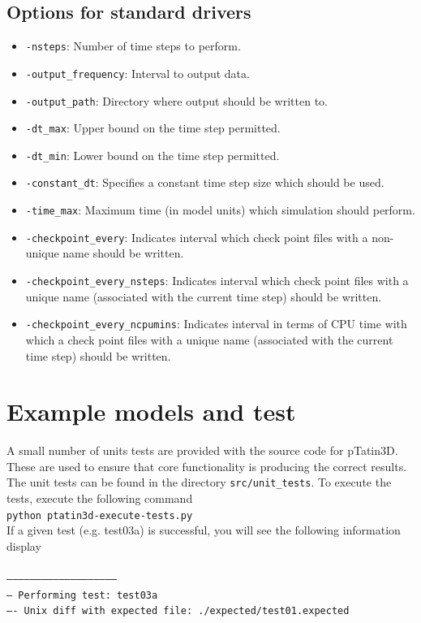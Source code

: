 \documentclass[paper=a4, fontsize=11pt,twoside]{scrartcl}
\newcommand{\ptat}{{{\sc pTatin3D}}}
\newcommand{\shellcmd}[1]{\\\indent\indent\texttt{\hspace{5mm}\footnotesize #1}\\}
\newcommand{\unix}[1]{\texttt{\footnotesize #1}}
\begin{document}
{{\subsection{Options for standard drivers}
\begin{itemize}
	\item \unix{-nsteps}: Number of time steps to perform.
	\item \unix{-output\_frequency}: Interval to output data.
	\item \unix{-output\_path}: Directory where output should be written to.
	\item \unix{-dt\_max}: Upper bound on the time step permitted.
	\item \unix{-dt\_min}: Lower bound on the time step permitted.
	\item \unix{-constant\_dt}: Specifies a constant time step size which should be used.
	\item \unix{-time\_max}: Maximum time (in model units) which simulation should perform.
	\item \unix{-checkpoint\_every}: Indicates interval which check point files with a non-unique name should be written.
	\item \unix{-checkpoint\_every\_nsteps}: Indicates interval which check point files with a unique name (associated with the current time step) should be written.
	\item \unix{-checkpoint\_every\_ncpumins}: Indicates interval in terms of CPU time with which a check point files with a unique name (associated with the current time step) should be written.
\end{itemize}

\newpage
\section{Example models and test}
A small number of units tests are provided with the source code for {\ptat}. These are used to ensure that core functionality is producing the correct results. The unit tests can be found in the directory \unix{src/unit\_tests}. To execute the tests, execute the following command
\shellcmd{python ptatin3d-execute-tests.py}
If a given test (e.g. test03a) is successful, you will see the following information display
\shellcmd{\\
--------------------------------------------------------\\
-- Performing test: test03a\\
---- Unix diff with expected file: ./expected/test01.expected}

}}
\end{document}
